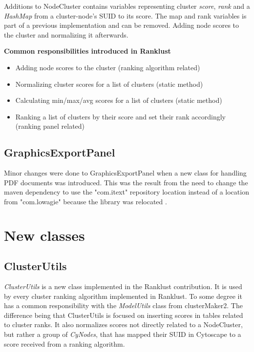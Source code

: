 Additions to NodeCluster contains variables representing cluster \textit{score},
\textit{rank} and a \textit{HashMap} from a cluster-node's SUID to its score.
The map and rank variables is part of a previous implementation and can be
removed. Adding node scores to the cluster and normalizing it afterwards.

\textbf{Common responsibilities introduced in Ranklust}

\begin{itemize}
    \item Adding node scores to the cluster (ranking algorithm related)
    \item Normalizing cluster scores for a list of clusters (static method)
    \item Calculating min/max/avg scores for a list of clusters (static method)
    \item Ranking a list of clusters by their score and set their rank
        accordingly (ranking panel related)
\end{itemize}

\subsection{GraphicsExportPanel}
Minor changes were done to GraphicsExportPanel when a new class for handling PDF
documents was introduced. This was the result from the need to change the maven
dependency to use the "com.itext"\cite{itext} repository location instead of
a location from "com.lowagie" because the library was relocated
\cite{lowagie-to-itext}.

\section{New classes}
\subsection{ClusterUtils}
\textit{ClusterUtils} is a new class implemented in the Ranklust contribution.
It is used by every cluster ranking algorithm implemented in Ranklust. To some
degree it has a common responsibility with the \textit{ModelUtils} class from
clusterMaker2. The difference being that ClusterUtils is focused on inserting
scores in tables related to cluster ranks. It also normalizes scores not
directly related to a NodeCluster, but rather a group of \textit{CyNodes}, that
has mapped their SUID in Cytoscape to a score received from a ranking algorithm.

